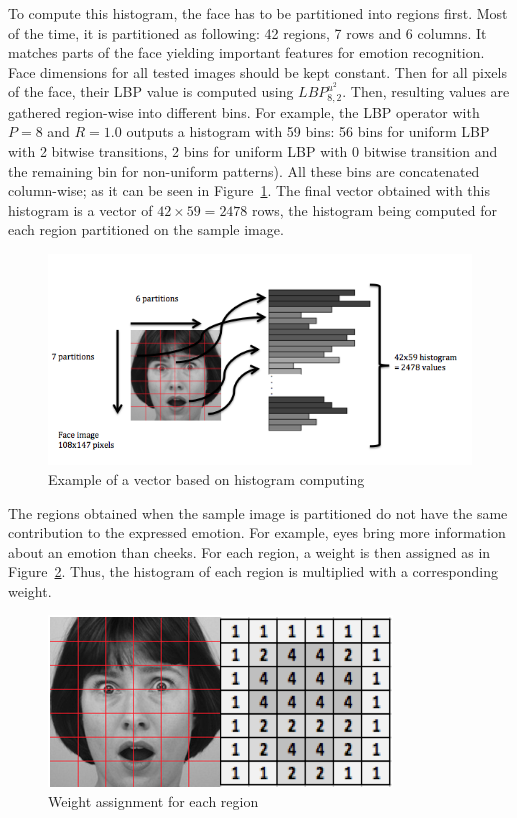 \noindent To compute this histogram, the face has to be partitioned into regions first. Most of the time, it is partitioned as following: 42 regions, 7 rows and 6 columns. It matches parts of the face yielding important features for emotion recognition. Face dimensions for all tested images should be kept constant. Then for all pixels of the face, their LBP value is computed using $ LBP_{8,2}^{u^2} $. Then, resulting values are gathered region-wise into different bins. For example, the LBP operator with $ P = 8 $ and $ R = 1.0 $ outputs a histogram with 59 bins: 56 bins for uniform LBP with 2 bitwise transitions, 2 bins for  uniform LBP with 0 bitwise transition and the remaining bin for non-uniform patterns). All these bins are concatenated column-wise; as it can be seen in Figure~\ref{lbp_histogram}. The final vector obtained with this histogram is a vector of $ 42\times59 = 2478 $ rows, the histogram being computed for each region partitioned on the sample image.
\newline

\begin{figure}[!h]
\begin{center}
\noindent \includegraphics[scale=0.7]{figures/lbp_histogram} 
\newline
\caption{Example of a vector based on histogram computing}
\label{lbp_histogram}
\end{center} 
\end{figure}

\noindent The regions obtained when the sample image is partitioned do not have the same contribution to the expressed emotion. For example, eyes bring more information about an emotion than cheeks. For each region, a weight is then assigned as in Figure~\ref{lbp_region_weight}. Thus, the histogram of each region is multiplied with a corresponding weight.
\newline

\begin{figure}[!h]
\begin{center}
\noindent \includegraphics[scale=0.4]{figures/lbp_region_weight} 
\newline
\caption{Weight assignment for each region}
\label{lbp_region_weight}
\end{center} 
\end{figure}
\newpage
